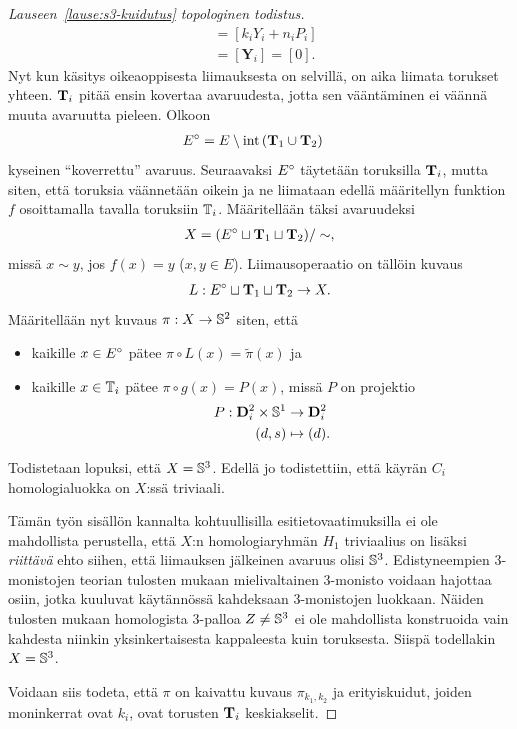 \begin{proof}[Lauseen~\ref{lause:s3-kuidutus} topologinen todistus]
\begin{align*}
        [C_i]&=[k_iY_i+n_iP_i] \\
        &=[\mathbf{Y}_i]=[0].
    \end{align*}
    Nyt kun käsitys oikeaoppisesta liimauksesta on selvillä, on aika liimata torukset yhteen. $\TT_i$ pitää ensin kovertaa avaruudesta, jotta sen vääntäminen ei väännä muuta avaruutta pieleen. Olkoon 
    \begin{align*}
        E\degree&=E\setminus\text{int}\left(\TT_1\cup\TT_2\right)
    \end{align*}
    kyseinen ``koverrettu'' avaruus. Seuraavaksi $E\degree$ täytetään toruksilla $\TT_i$, mutta siten, että toruksia väännetään oikein ja ne liimataan edellä määritellyn funktion $f$ osoittamalla tavalla toruksiin $\T_i$. Määritellään täksi avaruudeksi
    \begin{align*}
        X=(E\degree\sqcup\TT_1\sqcup\TT_2)/\sim,
    \end{align*}
    missä $x\sim y$, jos $f(x)=y$ ($x,y\in E$). Liimausoperaatio on tällöin kuvaus
    \begin{align*}
        L:E\degree\sqcup\TT_1\sqcup\TT_2\to X.
    \end{align*}
    Määritellään nyt kuvaus $\pi:X\to\S^2$ siten, että
    \begin{itemize}
        \item kaikille $x\in E\degree$ pätee $\pi\circ L(x)=\tilde{\pi}(x)$ ja
        \item kaikille $x\in\T_i$ pätee $\pi\circ g(x)=P(x)$, missä $P$ on projektio
        \begin{align*}
            P:\D_i^2\times\S^1&\to\D_i^2 \\
            (d,s)&\mapsto(d).
        \end{align*}
    \end{itemize}
    Todistetaan lopuksi, että $X=\S^3$. Edellä jo todistettiin, että käyrän $C_i$ homologialuokka on $X$:ssä triviaali.

    Tämän työn sisällön kannalta kohtuullisilla esitietovaatimuksilla ei ole mahdollista perustella, että $X$:n homologiaryhmän $H_1$ triviaalius on lisäksi \emph{riittävä} ehto siihen, että liimauksen jälkeinen avaruus olisi $\S^3$. Edistyneempien 3-monistojen teorian tulosten mukaan mielivaltainen 3-monisto voidaan hajottaa osiin, jotka kuuluvat käytännössä kahdeksaan 3-monistojen luokkaan. Näiden tulosten mukaan homologista 3-palloa $Z\ne\S^3$ ei ole mahdollista konstruoida vain kahdesta niinkin yksinkertaisesta kappaleesta kuin toruksesta. Siispä todellakin $X=\S^3$.

    Voidaan siis todeta, että $\pi$ on kaivattu kuvaus $\pi_{k_1,k_2}$ ja erityiskuidut, joiden moninkerrat ovat $k_i$, ovat torusten $\TT_i$ keskiakselit.
\end{proof}